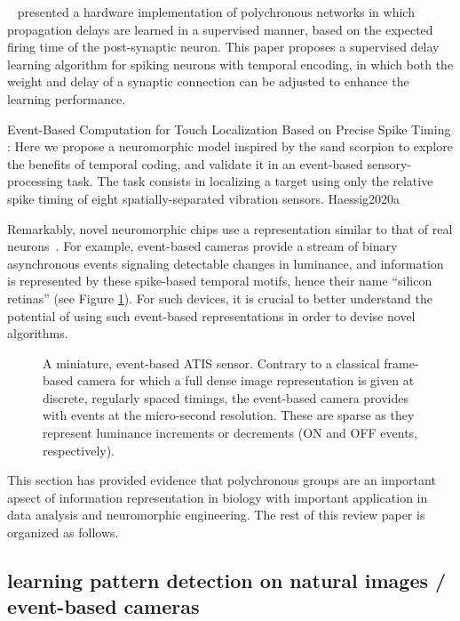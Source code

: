 \documentclass[brainsci, %
               review,submit,pdftex,moreauthors%
               ]{Definitions/mdpi}
\begin{document}
 ~\citet{wang_neuromorphic_2015} presented a hardware implementation of polychronous networks in which propagation delays are learned in a supervised manner, based on the expected firing time of the post-synaptic neuron. This paper proposes a supervised delay learning algorithm for spiking neurons with temporal encoding, in which both the weight and delay of a synaptic connection can be adjusted to enhance the learning performance.


Event-Based Computation for Touch Localization Based on Precise Spike Timing : Here we propose a neuromorphic model inspired by the sand scorpion to explore the benefits of temporal coding, and validate it in an event-based sensory-processing task. The task consists in localizing a target using only the relative spike timing of eight spatially-separated vibration sensors.  Haessig2020a

Remarkably, novel neuromorphic chips use a representation similar to that of real neurons~\citep{rasetto_challenges_2022}. For example, event-based cameras provide a stream of binary asynchronous events signaling detectable changes in luminance, and information is represented by these spike-based temporal motifs, hence their name ``silicon retinas'' (see Figure \ref{fig:silicon_retina}). For such devices, it is crucial to better understand the potential of using such event-based representations in order to devise novel algorithms.

\begin{figure}
\centering
\caption{A miniature, event-based ATIS sensor. Contrary to a classical frame-based camera for which a full dense image representation is given at discrete, regularly spaced timings, the event-based camera provides with events at the micro-second resolution. These are sparse as they represent luminance increments or decrements (ON and OFF events, respectively).}\label{fig:silicon_retina}
\end{figure}
This section has provided evidence that polychronous groups are an important apsect of information representation in biology with important application in data analysis and neuromorphic engineering. The rest of this review paper is organized as follows.



\subsection{learning pattern detection on natural images / event-based cameras}\label{learning-pattern-detection-on-natural-images-event-based-cameras}
\end{document}
